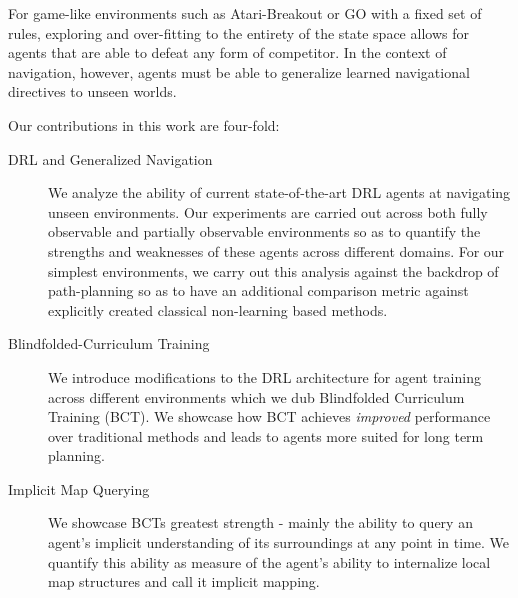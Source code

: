 For game-like environments such as Atari-Breakout or GO with a fixed set of rules, exploring and over-fitting to the entirety of the state space allows for agents that are able to defeat any form of competitor. In the context of navigation, however, agents must be able to generalize learned navigational directives to unseen worlds. 
 
Our contributions in this work are four-fold:

\begin{description}
    \item [DRL and Generalized Navigation]
        We analyze the ability of current state-of-the-art DRL agents at navigating unseen environments. Our experiments are carried out across both fully observable and partially observable environments so as to quantify the strengths and weaknesses of these agents across different domains. For our simplest environments, we carry out this analysis against the backdrop of path-planning so as to have an additional comparison metric against explicitly created classical non-learning based methods. 


    \item [Blindfolded-Curriculum Training]
        We introduce modifications to the DRL architecture for agent training across different environments which we dub Blindfolded Curriculum Training (BCT). We showcase how BCT achieves \textit{improved} performance over traditional methods and leads to agents more suited for long term planning.
    \item [Implicit Map Querying]
        We showcase BCTs greatest strength - mainly the ability to query an agent's implicit understanding of its surroundings at any point in time. We quantify this ability as measure of the agent's ability to internalize local map structures and call it implicit mapping. 
\end{description}

